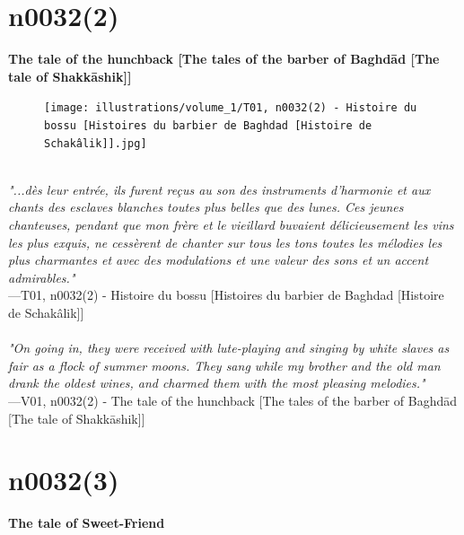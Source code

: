 \documentclass[../Carre_nights.tex]{subfiles}
\begin{document}
\newpage

\section{n0032(2)}
\textbf{\Large{The tale of the hunchback [The tales of the barber of Baghd\=ad [The tale of Shakk\=ashik]]}} \\

\begin{figure}[ht]
\centering
\texttt{[image: illustrations/volume\_1/T01, n0032(2) - Histoire du bossu [Histoires du barbier de Baghdad [Histoire de Schakâlik]].jpg]}
\end{figure}

\textit{\\
"...dès leur entrée, ils furent reçus au son des instruments d’harmonie et aux chants des esclaves blanches toutes plus belles que des lunes. Ces jeunes chanteuses, pendant que mon frère et le vieillard buvaient délicieusement les vins les plus exquis, ne cessèrent de chanter sur tous les tons toutes les mélodies les plus charmantes et avec des modulations et une valeur des sons et un accent admirables."} \\
—T01, n0032(2) - Histoire du bossu [Histoires du barbier de Baghdad [Histoire de Schakâlik]] \\~\\
\textit{"On going in, they were received with lute-playing and singing by white slaves as fair as a flock of summer moons. They sang while my brother and the old man drank the oldest wines, and charmed them with the most pleasing melodies."} \\
—V01, n0032(2) - The tale of the hunchback [The tales of the barber of Baghd\=ad [The tale of Shakk\=ashik]]

\newpage

\section{n0032(3)}
\textbf{\Large{The tale of Sweet-Friend}} \\
\end{document}
